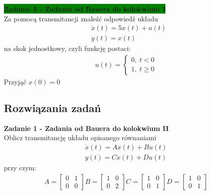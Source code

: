 \documentclass[a4paper,11pt]{article}
\begin{document}
\begin{framed}
\textbf{\colorbox{green}{Zadanie 5 - Zadania od Bauera do kolokwium I}} \\ 
Za pomocą transmitancji znaleźć odpowiedź układu
\begin{align*}
&\dot{x}(t)=5x(t)+u(t) \\
&y(t) = x(t)
\end{align*}
na skok jednostkowy, czyli funkcję postaci: 
\begin{align*}
u(t) =
\begin{cases}
0, \; t < 0 \\
1, \; t \geq 0
\end{cases}
\end{align*}
Przyjąć \( x(0) = 0 \)
\end{framed}

\newpage
\subsection{Rozwiązania zadań}
\begin{framed}
\textbf{Zadanie 1 - Zadania od Bauera do kolokwium II } \\ 
Oblicz transmitancję układu opisanego równaniami
\begin{align*}
\dot{x}(t)=Ax(t)+Bu(t) \\
y(t)=Cx(t)+Du(t)
\end{align*}
przy czym: \\
\begin{align*}
A = 
\begin{bmatrix}
0 & 1 \\
0 & 0
\end{bmatrix}
B = 
\begin{bmatrix}
1 & 0 \\
0 & 2
\end{bmatrix}
C = 
\begin{bmatrix}
1 & 0 \\
0 & 1
\end{bmatrix}
D = 
\begin{bmatrix}
1 & 0 \\
0 & 1
\end{bmatrix}
\end{align*}
\end{framed}
\end{document}
